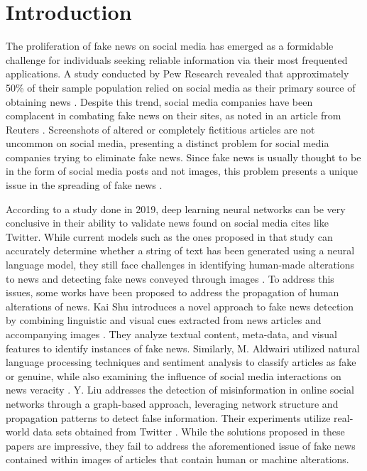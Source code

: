 \documentclass[conference]{IEEEtran}
\begin{document}
\section{Introduction}
The proliferation of fake news on social media has emerged as a formidable challenge for individuals seeking reliable information via their most frequented applications. A study conducted by Pew Research revealed that approximately 50\% of their sample population relied on social media as their primary source of obtaining news \cite{pew2021news}. Despite this trend, social media companies have been complacent in combating fake news on their sites, as noted in an article from Reuters \cite{reuters}. Screenshots of altered or completely fictitious articles are not uncommon on social media, presenting a distinct problem for social media companies trying to eliminate fake news. Since fake news is usually thought to be in the form of social media posts and not images, this problem presents a unique issue in the spreading of fake news \cite{acmpaper}.

According to a study done in 2019, \cite{fakenews} deep learning neural networks can be very conclusive in their ability to validate news found on social media cites like Twitter. While current models such as the ones proposed in that study can accurately determine whether a string of text has been generated using a neural language model, they still face challenges in identifying human-made alterations to news and detecting fake news conveyed through images \cite{paper4}. To address this issues, some works have been proposed to address the propagation of human alterations of news. Kai Shu introduces a novel approach to fake news detection by combining linguistic and visual cues extracted from news articles and accompanying images \cite{paper1}. They analyze textual content, meta-data, and visual features to identify instances of fake news. Similarly, M. Aldwairi utilized natural language processing techniques and sentiment analysis to classify articles as fake or genuine, while also examining the influence of social media interactions on news veracity \cite{paper2}. Y. Liu addresses the detection of misinformation in online social networks through a graph-based approach, leveraging network structure and propagation patterns to detect false information. Their experiments utilize real-world data sets obtained from Twitter \cite{paper3}. While the solutions proposed in these papers are impressive, they fail to address the aforementioned issue of fake news contained within images of articles that contain human or machine alterations.
\end{document}
